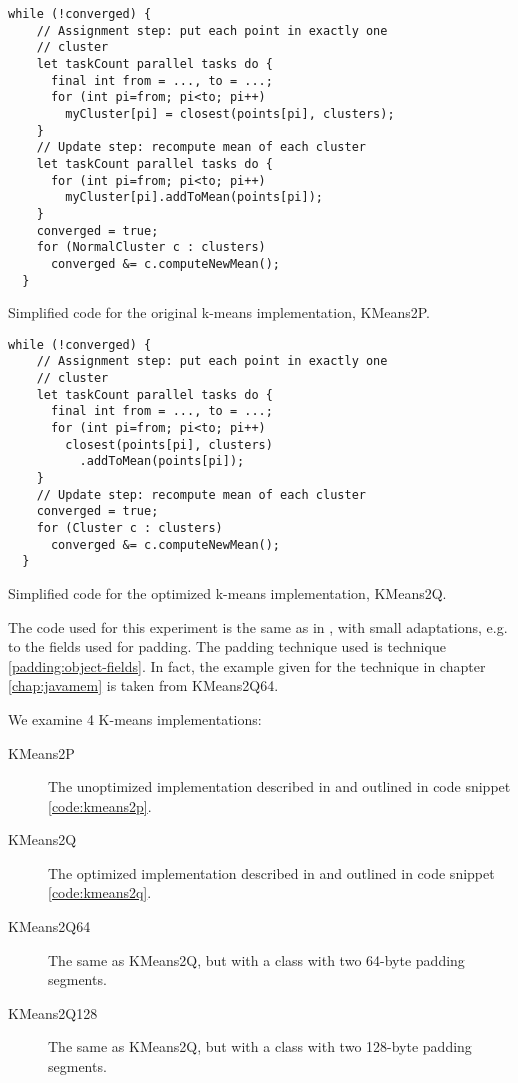 \begin{code}
\begin{Verbatim}[frame=single]
  while (!converged) {
    // Assignment step: put each point in exactly one
    // cluster
    let taskCount parallel tasks do {
      final int from = ..., to = ...;
      for (int pi=from; pi<to; pi++) 
        myCluster[pi] = closest(points[pi], clusters);
    }
    // Update step: recompute mean of each cluster
    let taskCount parallel tasks do {
      for (int pi=from; pi<to; pi++)
        myCluster[pi].addToMean(points[pi]);
    }
    converged = true;
    for (NormalCluster c : clusters)
      converged &= c.computeNewMean();
  }
\end{Verbatim}
	\caption{Simplified code for the original k-means implementation, KMeans2P.}
	\label{code:kmeans2p}
\end{code}

\begin{code}
\begin{Verbatim}[frame=single]
  while (!converged) {
    // Assignment step: put each point in exactly one
    // cluster
    let taskCount parallel tasks do {
      final int from = ..., to = ...;
      for (int pi=from; pi<to; pi++)
        closest(points[pi], clusters)
          .addToMean(points[pi]);
    }
    // Update step: recompute mean of each cluster
    converged = true;
    for (Cluster c : clusters)
      converged &= c.computeNewMean();
  }

\end{Verbatim}
	\caption{Simplified code for the optimized k-means implementation, KMeans2Q.}
	\label{code:kmeans2q}
\end{code}

The code used for this experiment is the same as in \cite{mystery}, with small
adaptations, e.g. to the fields used for padding. The padding technique used is
technique \ref{padding:object-fields}. In fact, the example given for the
technique in chapter \ref{chap:javamem} is taken from KMeans2Q64.

We examine 4 K-means implementations:

\begin{description}
	\item[KMeans2P] {The unoptimized implementation described
		in\cite{mystery} and outlined in code snippet
		\ref{code:kmeans2p}.}
	\item[KMeans2Q] {The optimized implementation described in \cite{mystery}
		and outlined in  code snippet \ref{code:kmeans2q}.}
	\item[KMeans2Q64] {The same as KMeans2Q, but with a  class
		with two 64-byte padding segments.}
	\item[KMeans2Q128] {The same as KMeans2Q, but with a  class
		with two 128-byte padding segments.}
\end{description}

